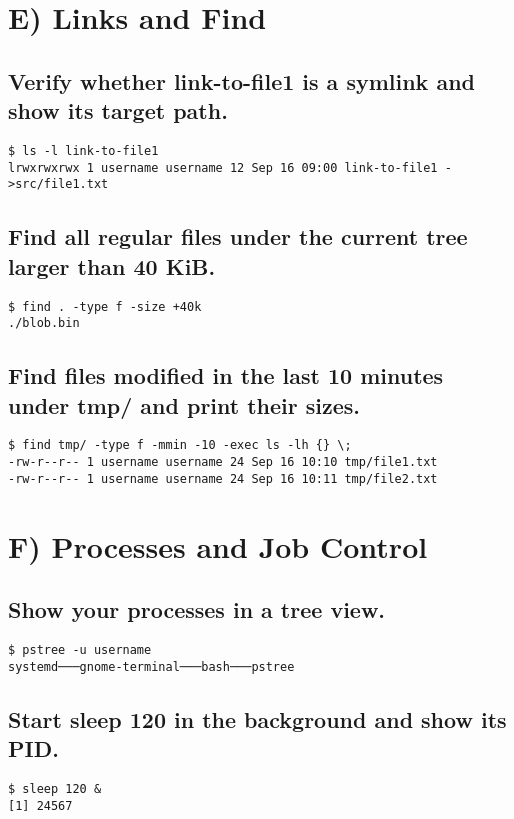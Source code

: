 \section{ E) Links and Find}
\subsection{Verify whether link-to-file1 is a symlink and show its target path.}
\begin{verbatim}
$ ls -l link-to-file1
lrwxrwxrwx 1 username username 12 Sep 16 09:00 link-to-file1 ->src/file1.txt
\end{verbatim}

\subsection{Find all regular files under the current tree larger than 40 KiB.}
\begin{verbatim}
$ find . -type f -size +40k
./blob.bin
\end{verbatim}

\subsection{Find files modified in the last 10 minutes under tmp/ and print their sizes.}
\begin{verbatim}
$ find tmp/ -type f -mmin -10 -exec ls -lh {} \;
-rw-r--r-- 1 username username 24 Sep 16 10:10 tmp/file1.txt
-rw-r--r-- 1 username username 24 Sep 16 10:11 tmp/file2.txt
\end{verbatim}

\section{F) Processes and Job Control}
\subsection{Show your processes in a tree view.}
\begin{verbatim}
$ pstree -u username
systemd───gnome-terminal───bash───pstree
\end{verbatim}

\subsection{Start sleep 120 in the background and show its PID.}
\begin{verbatim}
$ sleep 120 &
[1] 24567
\end{verbatim}


